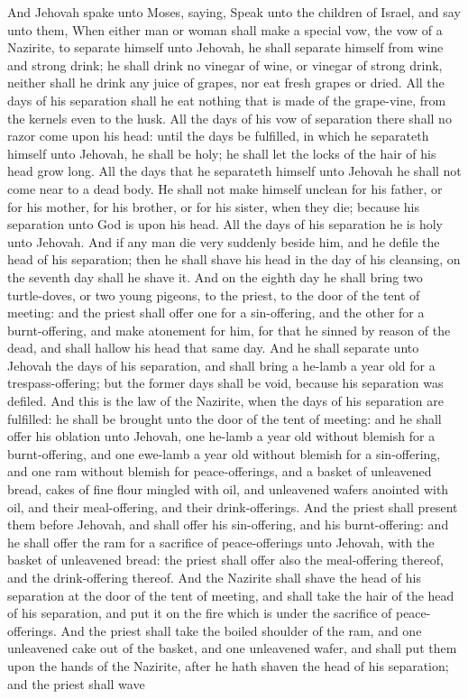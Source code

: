 And Jehovah spake unto Moses, saying, Speak unto the children of Israel, and say unto them, When either man or woman shall make a special vow, the vow of a Nazirite, to separate himself unto Jehovah, he shall separate himself from wine and strong drink; he shall drink no vinegar of wine, or vinegar of strong drink, neither shall he drink any juice of grapes, nor eat fresh grapes or dried. All the days of his separation shall he eat nothing that is made of the grape-vine, from the kernels even to the husk.  All the days of his vow of separation there shall no razor come upon his head: until the days be fulfilled, in which he separateth himself unto Jehovah, he shall be holy; he shall let the locks of the hair of his head grow long.  All the days that he separateth himself unto Jehovah he shall not come near to a dead body. He shall not make himself unclean for his father, or for his mother, for his brother, or for his sister, when they die; because his separation unto God is upon his head. All the days of his separation he is holy unto Jehovah.  And if any man die very suddenly beside him, and he defile the head of his separation; then he shall shave his head in the day of his cleansing, on the seventh day shall he shave it. And on the eighth day he shall bring two turtle-doves, or two young pigeons, to the priest, to the door of the tent of meeting: and the priest shall offer one for a sin-offering, and the other for a burnt-offering, and make atonement for him, for that he sinned by reason of the dead, and shall hallow his head that same day. And he shall separate unto Jehovah the days of his separation, and shall bring a he-lamb a year old for a trespass-offering; but the former days shall be void, because his separation was defiled.  And this is the law of the Nazirite, when the days of his separation are fulfilled: he shall be brought unto the door of the tent of meeting: and he shall offer his oblation unto Jehovah, one he-lamb a year old without blemish for a burnt-offering, and one ewe-lamb a year old without blemish for a sin-offering, and one ram without blemish for peace-offerings, and a basket of unleavened bread, cakes of fine flour mingled with oil, and unleavened wafers anointed with oil, and their meal-offering, and their drink-offerings. And the priest shall present them before Jehovah, and shall offer his sin-offering, and his burnt-offering: and he shall offer the ram for a sacrifice of peace-offerings unto Jehovah, with the basket of unleavened bread: the priest shall offer also the meal-offering thereof, and the drink-offering thereof. And the Nazirite shall shave the head of his separation at the door of the tent of meeting, and shall take the hair of the head of his separation, and put it on the fire which is under the sacrifice of peace-offerings. And the priest shall take the boiled shoulder of the ram, and one unleavened cake out of the basket, and one unleavened wafer, and shall put them upon the hands of the Nazirite, after he hath shaven the head of his separation; and the priest shall wave 
